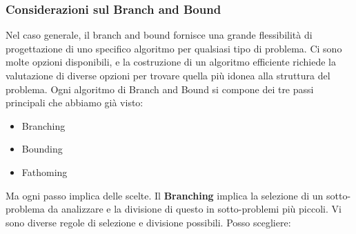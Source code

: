 \documentclass[12pt]{article}
\begin{document}
\subsubsection{Considerazioni sul Branch and Bound}
Nel caso generale, il branch and bound fornisce una grande flessibilità di progettazione di uno specifico algoritmo per
qualsiasi tipo di problema. Ci sono molte opzioni disponibili, e la costruzione di un algoritmo efficiente richiede
la valutazione di diverse opzioni per trovare quella più idonea alla struttura del problema.
Ogni algoritmo di Branch and Bound si compone dei tre passi principali che abbiamo già visto:
\begin{itemize}
    \item Branching
    \item Bounding
    \item Fathoming
\end{itemize}
Ma ogni passo implica delle scelte. \newline
Il \textbf{Branching} implica la selezione di un sotto-problema da analizzare e la divisione di questo
in sotto-problemi più piccoli. Vi sono diverse regole di selezione e divisione possibili. Posso scegliere:
\end{document}
